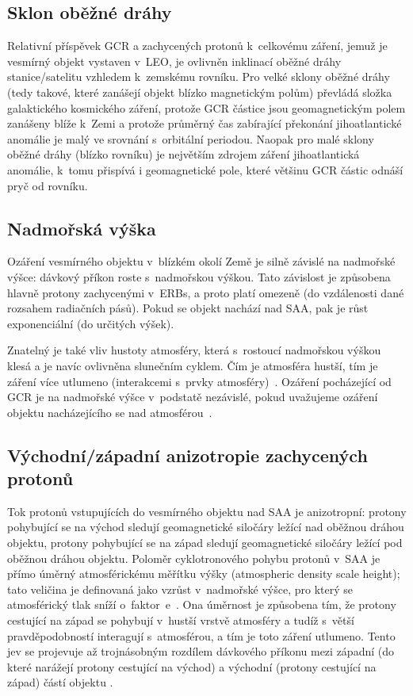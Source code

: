 \subsection{Sklon oběžné dráhy}
Relativní příspěvek GCR a zachycených protonů k~celkovému záření, jemuž je vesmírný objekt vystaven v~LEO, je ovlivněn inklinací oběžné dráhy stanice/satelitu vzhledem k~zemskému rovníku. Pro velké sklony oběžné dráhy (tedy takové, které zanášejí objekt blízko magnetickým polům) převládá složka galaktického kosmického záření, protože GCR částice jsou geomagnetickým polem zanášeny blíže k~Zemi a protože průměrný čas zabírající překonání jihoatlantické anomálie je malý ve srovnání s~orbitální periodou. Naopak pro malé sklony oběžné dráhy (blízko rovníku) je největším zdrojem záření jihoatlantická anomálie, k~tomu přispívá i geomagnetické pole, které většinu GCR částic odnáší pryč od rovníku.
\subsection{Nadmořská výška}\label{sec:kosmickeZareni_altitude}
Ozáření vesmírného objektu v~blízkém okolí Země je silně závislé na nadmořské výšce: dávkový příkon roste s~nadmořskou výškou. Tato závislost je způsobena hlavně protony zachycenými v~ERBs, a proto platí omezeně (do vzdálenosti dané rozsahem radiačních pásů). Pokud se objekt nachází nad SAA, pak je růst exponenciální (do určitých výšek). 

Znatelný je také vliv hustoty atmosféry, která s~rostoucí nadmořskou výškou klesá a je navíc ovlivněna slunečním cyklem. Čím je atmosféra hustší, tím je záření více utlumeno (interakcemi s~prvky atmosféry)~\cite{benton}. Ozáření pocházející od GCR je na nadmořské výšce v~podstatě nezávislé, pokud uvažujeme ozáření objektu nacházejícího se nad atmosférou~\cite{dosis}. 
\subsection{Východní/západní anizotropie zachycených protonů}\label{sec:kosmickeZareni_anizotropie}
Tok protonů vstupujících do vesmírného objektu nad SAA je anizotropní: protony pohybující se na východ sledují geomagnetické siločáry ležící nad oběžnou dráhou objektu, protony pohybující se na západ sledují geomagnetické siločáry ležící pod oběžnou dráhou objektu. Poloměr cyklotronového pohybu protonů v~SAA %
je přímo úměrný atmosférickému měřítku výšky (atmospheric density scale height); tato veličina je definovaná jako vzrůst v~nadmořské výšce, pro který se atmosférický tlak sníží o~faktor~e~\cite{scaleHeight_wiki}. Ona úměrnost je způsobena tím, že protony cestující na západ se pohybují v~hustší vrstvě atmosféry a tudíž s~větší pravděpodobností interagují s~atmosférou, a tím je toto záření utlumeno. Tento jev se projevuje až trojnásobným rozdílem dávkového příkonu mezi západní (do které narážejí protony cestující na východ) a východní (protony cestující na západ) částí objektu \cite{benton}. 
